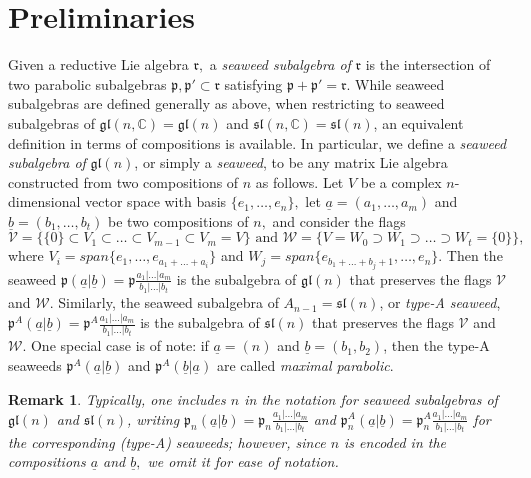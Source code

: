 \documentclass[letterpaper,10pt]{article}
\newtheorem{remark}[theorem]{Remark}
\begin{document}
\section{Preliminaries}\label{sec:prelim}
Given a reductive Lie algebra $\mathfrak{r},$ a \textit{seaweed subalgebra of} $\mathfrak{r}$ is the intersection of two parabolic subalgebras $\mathfrak{p},\mathfrak{p}'\subset\mathfrak{r}$ satisfying $\mathfrak{p}+\mathfrak{p}'=\mathfrak{r}.$ While seaweed subalgebras are defined generally as above, when restricting to seaweed subalgebras of $\mathfrak{gl}(n,\mathbb{C})=\mathfrak{gl}(n)$ and $\mathfrak{sl}(n,\mathbb{C})=\mathfrak{sl}(n)$, an equivalent definition in terms of compositions is available. In particular, we define a \textit{seaweed subalgebra of} $\mathfrak{gl}(n)$, or simply a \textit{seaweed}, to be any matrix Lie algebra constructed from two compositions of $n$ as follows. Let $V$ be a complex $n$-dimensional vector space with basis $\{e_1,\dots,e_n\},$ let $\underline{a}=(a_1,\dots,a_m)$ and $\underline{b}=(b_1,\dots,b_t)$ be two compositions of $n,$ and consider the flags $$\mathscr{V}=\big\{\{0\}\subset V_1\subset \dots\subset V_{m-1}\subset V_m=V\big\}\text{  and  }\mathscr{W}=\big\{V=W_0\supset W_1\supset\dots\supset W_t=\{0\}\big\},$$ where $V_i=span\{e_1,\dots,e_{a_1+\dots +a_i}\}$ and $W_j=span\{e_{b_1+\dots+b_j+1},\dots,e_n\}.$ Then the seaweed $\mathfrak{p}(\underline{a}|\underline{b})=\mathfrak{p}\frac{a_1|\dots|a_m}{b_1|\dots|b_t}$ is the subalgebra of $\mathfrak{gl}(n)$ that preserves the flags $\mathscr{V}$ and $\mathscr{W}.$ Similarly, the seaweed subalgebra of $A_{n-1}=\mathfrak{sl}(n)$, or \textit{type-A seaweed}, $\mathfrak{p}^A(\underline{a}|\underline{b})=\mathfrak{p}^A\frac{a_1|\dots|a_m}{b_1|\dots|b_t}$ is the subalgebra of $\mathfrak{sl}(n)$ that preserves the flags $\mathscr{V}$ and $\mathscr{W}$. One special case is of note: if $\underline{a}=(n)$ and $\underline{b}=(b_1,b_2)$, then the type-A seaweeds $\mathfrak{p}^A(\underline{a}|\underline{b})$ and $\mathfrak{p}^A(\underline{b}|\underline{a})$ are called \textit{maximal parabolic}.

\begin{remark}
Typically, one includes $n$ in the notation for seaweed subalgebras of $\mathfrak{gl}(n)$ and $\mathfrak{sl}(n)$, writing $\mathfrak{p}_n(\underline{a}|\underline{b})=\mathfrak{p}_n\frac{a_1|\dots|a_m}{b_1|\dots|b_t}$ and $\mathfrak{p}^A_n(\underline{a}|\underline{b})=\mathfrak{p}^A_n\frac{a_1|\dots|a_m}{b_1|\dots|b_t}$ for the corresponding \textup(type-A\textup) seaweeds; however, since $n$ is encoded in the compositions $\underline{a}$ and $\underline{b},$ we omit it for ease of notation.
\end{remark}
\end{document}
